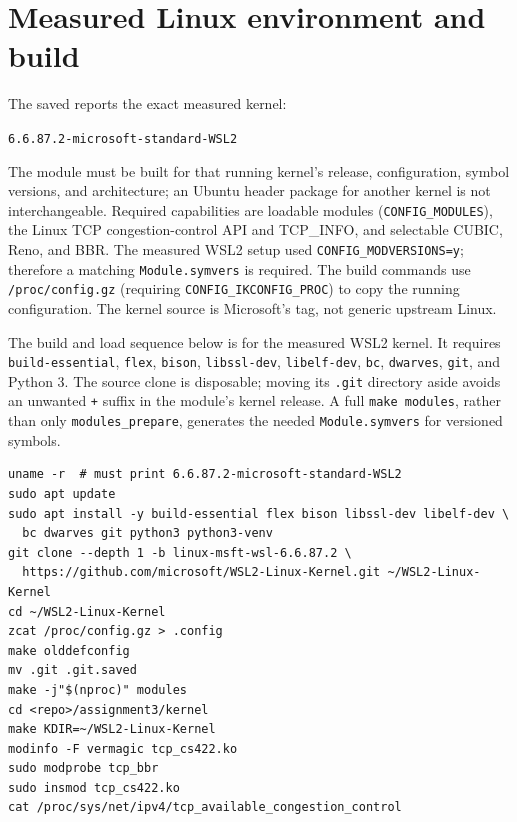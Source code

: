 \documentclass[11pt,letterpaper]{article}
\begin{document}
\section{Measured Linux environment and build}
The saved  reports the exact measured kernel:
\begin{center}\texttt{6.6.87.2-microsoft-standard-WSL2}\end{center}
The module must be built for that running kernel's release, configuration,
symbol versions, and architecture;
an Ubuntu header package for another kernel is not interchangeable. Required
capabilities are loadable modules (\texttt{CONFIG\_MODULES}), the Linux TCP
congestion-control API and TCP\_INFO, and selectable CUBIC, Reno, and BBR.
The measured WSL2 setup used \texttt{CONFIG\_MODVERSIONS=y}; therefore a
matching \texttt{Module.symvers} is required. The build commands use
\texttt{/proc/config.gz} (requiring \texttt{CONFIG\_IKCONFIG\_PROC}) to copy
the running configuration. The kernel source is Microsoft's
 tag, not generic upstream Linux.

The build and load sequence below is for the measured WSL2 kernel. It requires
\texttt{build-essential}, \texttt{flex}, \texttt{bison}, \texttt{libssl-dev},
\texttt{libelf-dev}, \texttt{bc}, \texttt{dwarves}, \texttt{git}, and Python 3.
The source clone is disposable; moving its \texttt{.git} directory aside avoids
an unwanted \texttt{+} suffix in the module's kernel release. A full
\texttt{make modules}, rather than only \texttt{modules\_prepare}, generates
the needed \texttt{Module.symvers} for versioned symbols.

\begin{verbatim}
uname -r  # must print 6.6.87.2-microsoft-standard-WSL2
sudo apt update
sudo apt install -y build-essential flex bison libssl-dev libelf-dev \
  bc dwarves git python3 python3-venv
git clone --depth 1 -b linux-msft-wsl-6.6.87.2 \
  https://github.com/microsoft/WSL2-Linux-Kernel.git ~/WSL2-Linux-Kernel
cd ~/WSL2-Linux-Kernel
zcat /proc/config.gz > .config
make olddefconfig
mv .git .git.saved
make -j"$(nproc)" modules
cd <repo>/assignment3/kernel
make KDIR=~/WSL2-Linux-Kernel
modinfo -F vermagic tcp_cs422.ko
sudo modprobe tcp_bbr
sudo insmod tcp_cs422.ko
cat /proc/sys/net/ipv4/tcp_available_congestion_control
\end{verbatim}
\end{document}
